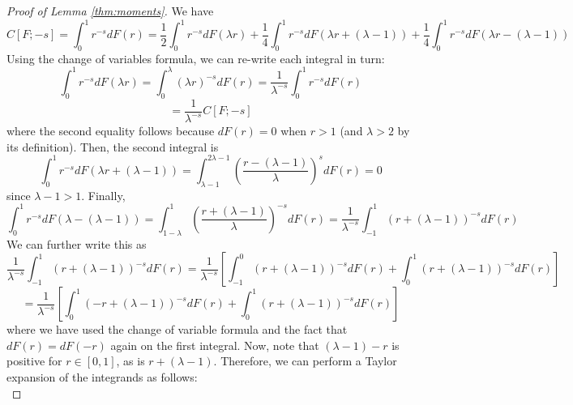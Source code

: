 \documentclass{article}
\begin{document}
\begin{proof}[Proof of Lemma \ref{thm:moments}]
    We have
    \begin{equation}
        C[F;-s] = \int_0^1 r^{-s}dF(r) = \frac{1}{2}\int_0^1 r^{-s}dF(\lambda r) + \frac{1}{4}\int_0^1 r^{-s}dF(\lambda r + (\lambda-1)) + \frac{1}{4}\int_0^1 r^{-s}dF(\lambda r - (\lambda -1 ))
    \end{equation}
    Using the change of variables formula, we can re-write each integral in turn:
    \begin{equation}
        \int_0^1 r^{-s}dF(\lambda r) = \int_0^{\lambda} (\lambda r)^{-s} dF(r) = \frac{1}{\lambda^{-s}}\int_0^1r^{-s}dF(r)
    \end{equation}
    \begin{equation}
        = \frac{1}{\lambda^{-s}}C[F;-s]
    \end{equation}
    where the second equality follows because $dF(r) = 0$ when $r > 1$ (and $\lambda>2$ by its definition). Then, the second integral is
    \begin{equation}
        \int_0^1 r^{-s}dF(\lambda r + (\lambda-1)) = \int_{\lambda-1}^{2\lambda-1} \left(\frac{r - (\lambda -1)}{\lambda}\right)^s dF(r) = 0
    \end{equation}
    since $\lambda-1 > 1$. Finally,
    \begin{equation}
        \label{eq:the_saviour}
        \int_0^1 r^{-s}dF(\lambda - (\lambda -1)) = \int_{1-\lambda}^1 \left(\frac{r + (\lambda - 1)}{\lambda}\right)^{-s}dF(r) = \frac{1}{\lambda^{-s}}\int_{-1}^1(r+(\lambda-1))^{-s}dF(r)
    \end{equation}
    We can further write this as
    \begin{equation}
        \frac{1}{\lambda^{-s}}\int_{-1}^1(r+(\lambda-1))^{-s}dF(r) = \frac{1}{\lambda^{-s}}\left[\int_{-1}^0 (r+(\lambda-1))^{-s}dF(r) + \int_0^1 (r+(\lambda-1))^{-s}dF(r)\right]
    \end{equation}
    \begin{equation}
        \label{eq:integral_difference}
        = \frac{1}{\lambda^{-s}}\left[\int_{0}^1 (-r+(\lambda-1))^{-s}dF(r) + \int_0^1 (r+(\lambda-1))^{-s}dF(r)\right]
    \end{equation}
    where we have used the change of variable formula and the fact that $dF(r) = dF(-r)$ again on the first integral. Now, note that $(\lambda-1)-r$ is positive for $r \in[0,1]$, as is $r+(\lambda-1)$. Therefore, we can perform a Taylor expansion of the integrands as follows:
    \begin{equation}

\end{equation}
\end{proof}
\end{document}
